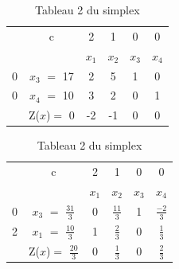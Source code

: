 \begin{table}[h!]	
\centering
	\begin{tabular}{|c|c|c|c|c|c|}
	\hline
      & c & 2 & 1 & 0 & 0 \\ 
      \cline{2-6}
       &  & $x_{1}$ & $x_{2}$  & $x_{3}$  & $x_{4}$ \\
       \hline
   0 & $x_{3}$  $=$ 17 & 2 & 5 & 1 & 0 \\
      \hline
	0 & $x_{4}$ $=$ 10  & 3 & 2 & 0 & 1 \\
	  \hline
	 & Z($x$)$=$ 0 & -2 & -1 & 0 & 0\\
	  \hline
	\end{tabular}
\caption {Tableau 1 du simplex}	
\centering
	\begin{tabular}{|c|c|c|c|c|c|}
	\hline
      & c & 2 & 1 & 0 & 0 \\ 
      \cline{2-6}
       &  & $x_{1}$ & $x_{2}$  & $x_{3}$  & $x_{4}$ \\
       \hline
   0 & $x_{3}$  $=$ $\frac{31}{3}$ & 0 & $\frac{11}{3}$ & 1 & $\frac{-2}{3}$ \\
      \hline
	2 & $x_{1}$ $=$ $\frac{10}{3}$  & 1 & $\frac{2}{3}$ & 0 & $\frac{1}{3}$ \\
	  \hline
	 & Z($x$)$=$ $\frac{20}{3}$ & 0 & $\frac{1}{3}$ & 0 & $\frac{2}{3}$\\
	  \hline
	\end{tabular}
\caption {Tableau 2 du simplex}
\end{table}



